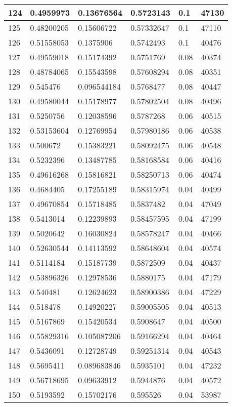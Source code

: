 \begin{longtable}{|l|l|l|l|l|l|}
124 & 0.4959973 & 0.13676564 & 0.5723143 & 0.1 & 47130 \\ \hline 
125 & 0.48200205 & 0.15606722 & 0.57332647 & 0.1 & 47110 \\ \hline 
126 & 0.51558053 & 0.1375906 & 0.5742493 & 0.1 & 40476 \\ \hline 
127 & 0.49559018 & 0.15174392 & 0.5751769 & 0.08 & 40374 \\ \hline 
128 & 0.48784065 & 0.15543598 & 0.57608294 & 0.08 & 40351 \\ \hline 
129 & 0.545476 & 0.096544184 & 0.5768477 & 0.08 & 40447 \\ \hline 
130 & 0.49580044 & 0.15178977 & 0.57802504 & 0.08 & 40496 \\ \hline 
131 & 0.5250756 & 0.12038596 & 0.5787268 & 0.06 & 40515 \\ \hline 
132 & 0.53153604 & 0.12769954 & 0.57980186 & 0.06 & 40538 \\ \hline 
133 & 0.500672 & 0.15383221 & 0.58092475 & 0.06 & 40548 \\ \hline 
134 & 0.5232396 & 0.13487785 & 0.58168584 & 0.06 & 40416 \\ \hline 
135 & 0.49616268 & 0.15816821 & 0.58250713 & 0.06 & 40474 \\ \hline 
136 & 0.4684405 & 0.17255189 & 0.58315974 & 0.04 & 40499 \\ \hline 
137 & 0.49670854 & 0.15718485 & 0.5837482 & 0.04 & 47049 \\ \hline 
138 & 0.5413014 & 0.12239893 & 0.58457595 & 0.04 & 47199 \\ \hline 
139 & 0.5020642 & 0.16030824 & 0.58578247 & 0.04 & 40466 \\ \hline 
140 & 0.52630544 & 0.14113592 & 0.58648604 & 0.04 & 40574 \\ \hline 
141 & 0.5114184 & 0.15187739 & 0.5872509 & 0.04 & 40437 \\ \hline 
142 & 0.53896326 & 0.12978536 & 0.5880175 & 0.04 & 47179 \\ \hline 
143 & 0.540481 & 0.12624623 & 0.58900386 & 0.04 & 47229 \\ \hline 
144 & 0.518478 & 0.14920227 & 0.59005505 & 0.04 & 40513 \\ \hline 
145 & 0.5167869 & 0.15420534 & 0.5908647 & 0.04 & 40500 \\ \hline 
146 & 0.55829316 & 0.105087206 & 0.59166294 & 0.04 & 40464 \\ \hline 
147 & 0.5436091 & 0.12728749 & 0.59251314 & 0.04 & 40543 \\ \hline 
148 & 0.5695411 & 0.089683846 & 0.5935101 & 0.04 & 47232 \\ \hline 
149 & 0.56718695 & 0.09633912 & 0.5944876 & 0.04 & 40572 \\ \hline 
150 & 0.5193592 & 0.15702176 & 0.595526 & 0.04 & 53987 \\ \hline 
\end{longtable}